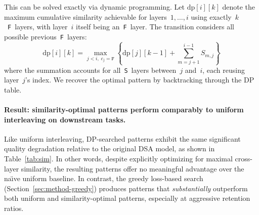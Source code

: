 This can be solved exactly via dynamic programming.
Let $\mathrm{dp}[i][k]$ denote the maximum cumulative similarity achievable for layers~$1, \ldots, i$ using exactly~$k$~\texttt{F}~layers, with layer~$i$ itself being an~\texttt{F}~layer.
The transition considers all possible previous~\texttt{F}~layers:
\begin{equation}
    \mathrm{dp}[i][k] = \max_{j < i,\; c_j = \texttt{F}} \left\{ \mathrm{dp}[j][k{-}1] + \sum_{m=j+1}^{i-1} S_{m,j} \right\}
\end{equation}
where the summation accounts for all~\texttt{S}~layers between~$j$ and~$i$, each reusing layer~$j$'s index.
We recover the optimal pattern by backtracking through the DP table.

\begin{table}[t]
\centering
\caption{%
    Evaluation results of training-free \emph{similarity-based} searched pattern.
}
\label{tab:sim}
\end{table}

\paragraph{Result: similarity-optimal patterns perform comparably to uniform interleaving on downstream tasks.}
Like uniform interleaving, DP-searched patterns exhibit the same significant quality degradation relative to the original DSA model, as shown in Table~\ref{tab:sim}.
In other words, despite explicitly optimizing for maximal cross-layer similarity, the resulting patterns offer no meaningful advantage over the na\"{\i}ve uniform baseline.
In contrast, the greedy loss-based search (Section~\ref{sec:method-greedy}) produces patterns that \emph{substantially} outperform both uniform and similarity-optimal patterns, especially at aggressive retention ratios.

